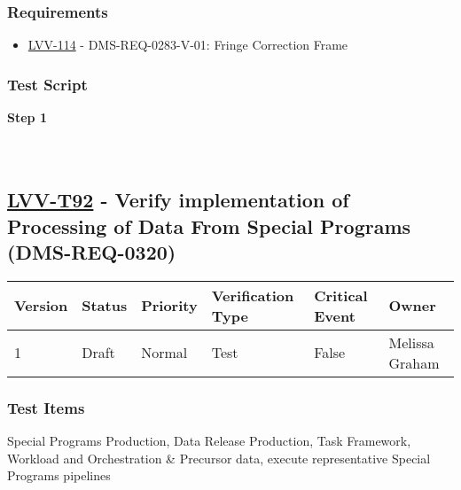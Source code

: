 \hypertarget{requirements-181}{%
\subsubsection{Requirements}\label{requirements-181}}

\begin{itemize}
\tightlist
\item
  \href{https://jira.lsstcorp.org/browse/LVV-114}{LVV-114} -
  DMS-REQ-0283-V-01: Fringe Correction Frame
\end{itemize}

\hypertarget{test-script-181}{%
\subsubsection{Test Script}\label{test-script-181}}

\textbf{Step 1}\\
~\\
~\\

\hypertarget{lvv-t92---verify-implementation-of-processing-of-data-from-special-programs-dms-req-0320}{%
\subsection{\texorpdfstring{\href{https://jira.lsstcorp.org/secure/Tests.jspa\#/testCase/LVV-T92}{LVV-T92}
- Verify implementation of Processing of Data From Special Programs
(DMS-REQ-0320)}{LVV-T92 - Verify implementation of Processing of Data From Special Programs (DMS-REQ-0320)}}\label{lvv-t92---verify-implementation-of-processing-of-data-from-special-programs-dms-req-0320}}

\begin{longtable}[]{@{}llllll@{}}
\toprule
Version & Status & Priority & Verification Type & Critical Event &
Owner\tabularnewline
\midrule
\endhead
1 & Draft & Normal & Test & False & Melissa Graham\tabularnewline
\bottomrule
\end{longtable}

\hypertarget{test-items-181}{%
\subsubsection{Test Items}\label{test-items-181}}

Special Programs Production, Data Release Production, Task Framework,
Workload and Orchestration \& Precursor data, execute representative
Special Programs pipelines

